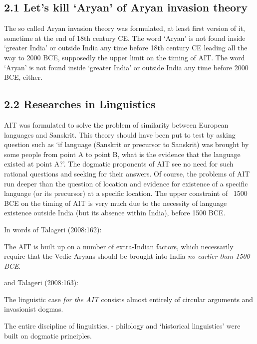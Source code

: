 \subsection*{2.1 Let’s kill ‘Aryan’ of Aryan invasion theory}

The so called Aryan invasion theory was formulated, at least first version of it, sometime at the end of 18th century CE. The word ‘Aryan’ is not found inside ‘greater India’ or outside India any time before 18th century CE leading all the way to 2000 BCE, supposedly the upper limit on the timing of AIT. The word ‘Aryan’ is not found inside ‘greater India’ or outside India any time before 2000 BCE, either.


\subsection*{2.2 Researches in Linguistics}

AIT was formulated to solve the problem of similarity between European languages and Sanskrit. This theory should have been put to test by asking question such as ‘if language (Sanskrit or precursor to Sanskrit) was brought by some people from point A to point B, what is the evidence that the language existed at point A?’. The dogmatic proponents of AIT see no need for such rational questions and seeking for their answers. Of course, the problems of AIT run deeper than the question of location and evidence for existence of a specific language (or its precursor) at a specific location. The upper constraint of ~1500 BCE on the timing of AIT is very much due to the necessity of language existence outside India (but its absence within India), before 1500 BCE.

In words of Talageri (2008:162):

\begin{myquote}
The AIT is built up on a number of extra-Indian factors, which necessarily require that the Vedic Aryans should be brought into India \textit{no earlier than 1500 BCE}.
\end{myquote}

and Talageri (2008:163):

\begin{myquote}
The linguistic case \textit{for the AIT} consists almost entirely of circular arguments and invasionist dogmas.
\end{myquote}

The entire discipline of linguistics, - philology and ‘historical linguistics’ were built on dogmatic principles.

